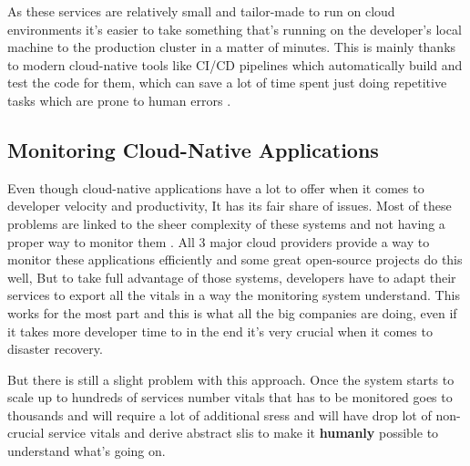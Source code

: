 As these services are relatively small and tailor-made to run on cloud environments it's easier to take something that's running on the developer's local machine to the production cluster in a matter of minutes. This is mainly thanks to modern cloud-native tools like CI/CD pipelines which automatically build and test the code for them, which can save a lot of time spent just doing repetitive tasks which are prone to human errors \citep{Whataret68:online}.

\subsection{Monitoring Cloud-Native Applications} \label{monitoring-bg}
Even though cloud-native applications have a lot to offer when it comes to developer velocity and productivity, It has its fair share of issues. Most of these problems are linked to the sheer complexity of these systems and not having a proper way to monitor them \citep{5WaysYou35:online}. All 3 major cloud providers provide a way to monitor these applications efficiently and some great open-source projects do this well, But to take full advantage of those systems, developers have to adapt their services to export all the vitals in a way the monitoring system understand. This works for the most part and this is what all the big companies are doing, even if it takes more developer time to in the end it's very crucial when it comes to disaster recovery.

But there is still a slight problem with this approach. Once the system starts to scale up to hundreds of services number vitals that has to be monitored goes to thousands and will require a lot of additional \acp{sres} and will have drop lot of non-crucial service vitals and derive abstract \acp{sli} to make it \textbf{humanly} possible to understand what's going on.\\

